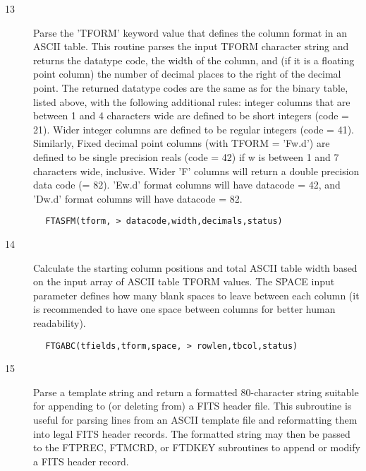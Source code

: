 \documentclass[11pt]{book}
\begin{document}
\begin{description}
\item[13] Parse the 'TFORM' keyword value that defines the column format in
    an ASCII table.  This routine parses the input TFORM character
    string and returns the datatype code, the width of the column,
    and (if it is a floating point column) the number of decimal places
    to the right of the decimal point.  The returned datatype codes are
    the same as for the binary table, listed above, with the following
    additional rules:  integer columns that are between 1 and 4 characters
    wide are defined to be short integers (code = 21).  Wider integer
    columns are defined to be regular integers (code = 41).  Similarly,
    Fixed decimal point columns (with TFORM = 'Fw.d') are defined to
    be single precision reals (code = 42) if w is between 1 and 7 characters
    wide, inclusive.  Wider 'F' columns will return a double precision
    data code (= 82).  'Ew.d' format columns will have datacode = 42,
   and 'Dw.d' format columns will have datacode = 82.
\end{description}

\begin{verbatim}
        FTASFM(tform, > datacode,width,decimals,status)
\end{verbatim}

\begin{description}
\item[14] Calculate the starting column positions and total ASCII table width
    based on the input array of ASCII table TFORM values.  The SPACE input
    parameter defines how many blank spaces to leave between each column
    (it is recommended to have one space between columns for better human
   readability).
\end{description}

\begin{verbatim}
        FTGABC(tfields,tform,space, > rowlen,tbcol,status)
\end{verbatim}

\begin{description}
\item[15] Parse a template string and return a formatted 80-character string
    suitable for appending to (or deleting from) a FITS header file.
    This subroutine is useful for parsing lines from an ASCII template file
    and reformatting them into legal FITS header records.  The formatted
    string may then be passed to the FTPREC, FTMCRD, or FTDKEY subroutines
   to append or modify a FITS header record.
\end{description}
\end{document}
